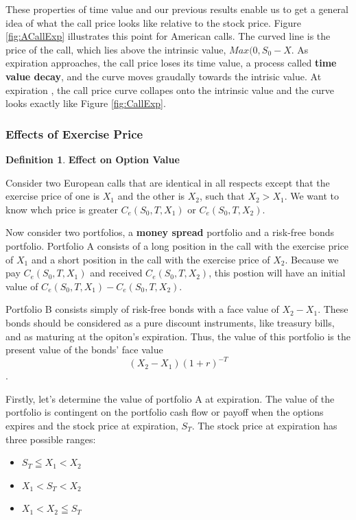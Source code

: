 \documentclass{book}
\theoremstyle{definition}
\newtheorem{definition}{Definition}[section]
\theoremstyle{remark}
\begin{document}
            These properties of time value and our previous results enable us to get a general idea of what the call price looks like relative to the stock price. Figure \ref{fig:ACallExp} illustrates this point for American calls. The curved line is the price of the call, which lies above the intrinsic value, $Max(0, S_0 -X$. As expiration approaches, the call price loses its time value, a process called \textbf{time value decay}, and the curve moves graudally towards the intrisic value. At expiration , the call price curve collapes onto the intrinsic value and the curve looks exactly like Figure \ref{fig:CallExp}. 
        \subsubsection{Effects of Exercise Price}
            \begin{definition}{\textbf{Effect on Option Value}}
                
                Consider two European calls that are identical in all respects except that the exercise price of one is $X_1$ and the other is $X_2$, such that $X_2 > X_1$. We want to know whch price is greater $C_e(S_0, T, X_1)$ or $C_e(S_0, T, X_2)$. 
                
                Now consider two portfolios, a \textbf{money spread} portfolio and a risk-free bonds portfolio. Portfolio A consists of a long position in the call with the exercise price of $X_1$ and a short position in the call with the exercise price of $X_2$. Because we pay $C_e(S_0, T, X_1)$ and received $C_e(S_0, T, X_2)$, this postion will have an initial value of $C_e(S_0, T, X_1) - C_e(S_0, T, X_2)$. 
                
                Portfolio B consists simply of risk-free bonds with a face value of $X_2 - X_1$. These bonds should be considered as a pure discount instruments, like treasury bills, and as maturing at the opiton's expiration. Thus, the value of this portfolio is the present value of the bonds' face value $$ (X_2 - X_1)(1+r)^{-T} $$.
                
                Firstly, let's determine the value of portfolio A at expiration. The value of the portfolio is contingent on the portfolio cash flow or payoff when the options expires and the stock price at expiration, $S_T$. The stock price at expiration has three possible ranges:
                    \begin{itemize}
                        \item $S_T \leqq X_1 < X_2$
                        \item $X_1 < S_T < X_2$
                        \item $X_1 < X_2 \leqq S_T$
                    \end{itemize}
                

\end{definition}
\end{document}
